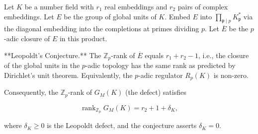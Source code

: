 Let $K$ be a number field with $r_1$ real embeddings and $r_2$ pairs of complex embeddings. Let $E$ be the group of global units of $K$. Embed $E$ into $\prod_{\mathfrak{p} \mid p} K_\mathfrak{p}^*$ via the diagonal embedding into the completions at primes dividing $p$. Let $\overline{E}$ be the $p$-adic closure of $E$ in this product.

**Leopoldt's Conjecture.** The $\mathbb{Z}_p$-rank of $\overline{E}$ equals $r_1 + r_2 - 1$, i.e., the closure of the global units in the $p$-adic topology has the same rank as predicted by Dirichlet's unit theorem. Equivalently, the $p$-adic regulator $R_p(K)$ is non-zero.

Consequently, the $\mathbb{Z}_p$-rank of $G_M(K)$ (the defect) satisfies

$$\operatorname{rank}_{\mathbb{Z}_p} G_M(K) = r_2 + 1 + \delta_K,$$

where $\delta_K \geq 0$ is the Leopoldt defect, and the conjecture asserts $\delta_K = 0$.
